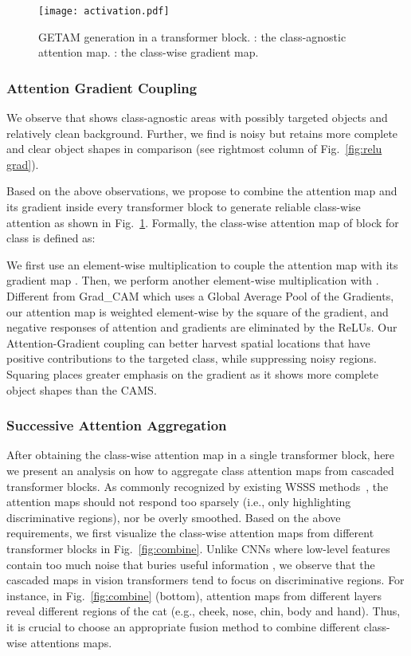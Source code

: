 \documentclass[10pt,twocolumn,letterpaper]{article}
\begin{document}
\begin{figure}[!t]
\begin{center}
  {\texttt{[image: activation.pdf]}}
  \end{center}
\caption{GETAM generation in a transformer block.
: the class-agnostic attention map. : the class-wise gradient map.}
\label{fig:getam}
\end{figure}

\subsubsection{Attention Gradient Coupling}
We observe that
 shows class-agnostic areas with possibly targeted objects and relatively clean background. 
Further, we find  is noisy but retains more complete and clear object shapes in comparison (see rightmost column of Fig.~\ref{fig:relu grad}). 

Based on the above observations, we propose to combine the attention map and its gradient inside every transformer block to generate reliable class-wise attention as shown in Fig.~\ref{fig:getam}.
Formally, the class-wise attention map of block  for class  is defined as:

\noindent
We first use an element-wise multiplication  to couple the attention map  with its gradient map .
Then, we perform another element-wise multiplication with . 
Different from Grad\_CAM which uses a Global Average Pool of the Gradients, 
our attention map is weighted element-wise by the square of the gradient, and negative responses of attention and gradients are eliminated by the ReLUs. 
Our Attention-Gradient coupling can better harvest spatial locations that have positive contributions to the targeted class, while suppressing noisy regions. Squaring places greater emphasis on the gradient as it shows more complete object shapes than the CAMS.


\subsubsection{Successive Attention Aggregation}
After obtaining the class-wise attention map in a single transformer block, here we present an analysis on how to aggregate class attention maps from cascaded transformer blocks. 
As commonly recognized by existing WSSS methods~\cite{sun2022inferring,Sun_2021_ICCV,Sun_2021_ICCV,Zhang_2021_ICCV,wang2020self}, the attention maps should not respond too sparsely (i.e., only highlighting discriminative regions), nor be overly smoothed.
Based on the above requirements, we first visualize the class-wise attention maps from different transformer blocks in Fig.~\ref{fig:combine}.
Unlike CNNs where low-level features contain too much noise that buries useful information \cite{wei2021shallow,jiang2021layercam}, we observe that the cascaded maps in vision transformers tend to focus on discriminative regions. For instance, in Fig.~\ref{fig:combine} (bottom), attention maps from different layers reveal different regions of the cat (e.g., cheek, nose, chin, body and hand).
Thus, it is crucial to choose an appropriate fusion method to combine different class-wise attentions maps.
\end{document}
